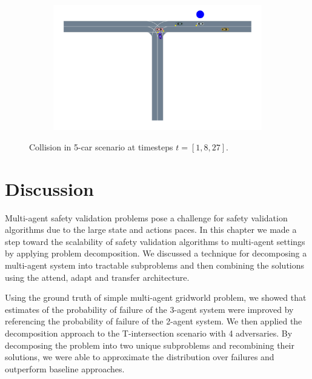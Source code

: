 \begin{figure}
\begin{subfigure}[t]{0.7\textwidth}
    \includegraphics[width=\textwidth, trim={2cm 5cm 1cm 0},clip]{figures/problem_decomposition/f2_27.pdf}
\end{subfigure}
    \caption{Collision in 5-car scenario at timesteps $t=[1,8,27]$.}
    \label{fig:five_car_collision2}
    \vspace{-0.2in}
\end{figure}


\section{Discussion}

Multi-agent safety validation problems pose a challenge for safety validation algorithms due to the large state and actions paces. In this chapter we made a step toward the scalability of safety validation algorithms to multi-agent settings by applying problem decomposition. We discussed a technique for decomposing a multi-agent system into tractable subproblems and then combining the solutions using the attend, adapt and transfer architecture. 

Using the ground truth of simple multi-agent gridworld problem, we showed that estimates of the probability of failure of the \num{3}-agent system were improved by referencing the probability of failure of the \num{2}-agent system. We then applied the decomposition approach to the T-intersection scenario with \num{4} adversaries. By decomposing the problem into two unique subproblems and recombining their solutions, we were able to approximate the distribution over failures and outperform baseline approaches. 

